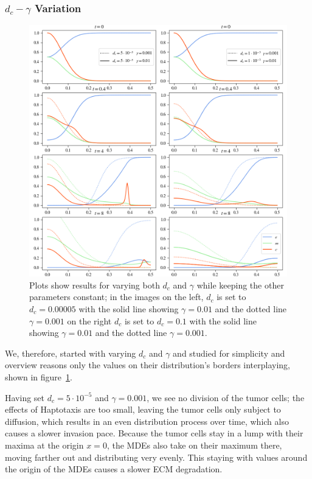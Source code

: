 \subsubsection*{$d_c - \gamma$ Variation}
\begin{figure}[h!]
 \centering
 \includegraphics[width=\textwidth]{resources/images/dc_gamma_variation.png}
 \caption{Plots show results for varying both $d_c$ and $\gamma$ while keeping the other parameters constant; in the images on the left, $d_c$ is set to $d_c=0.00005$ with the solid line showing $\gamma = 0.01$ and the dotted line $\gamma=0.001$ on the right $d_c$ is set to $d_c=0.1$ with the solid line showing $\gamma = 0.01$ and the dotted line $\gamma=0.001$.}
 \label{fig:dc_gamma_variation}
\end{figure}
We, therefore, started with varying $d_c$ and $\gamma$ and studied for simplicity and overview reasons only the values on their distribution's borders interplaying, shown in figure~\ref{fig:dc_gamma_variation}.

Having set $d_c=5\cdot 10^{-5}$ and $\gamma=0.001$, we see no division of the tumor cells; the effects of Haptotaxis are too small, leaving the tumor cells only subject to diffusion, which results in an even distribution process over time, which also causes a slower invasion pace. Because the tumor cells stay in a lump with their maxima at the origin $x=0$, the MDEs also take on their maximum there, moving farther out and distributing very evenly. This staying with values around the origin of the MDEs causes a slower ECM degradation. 

